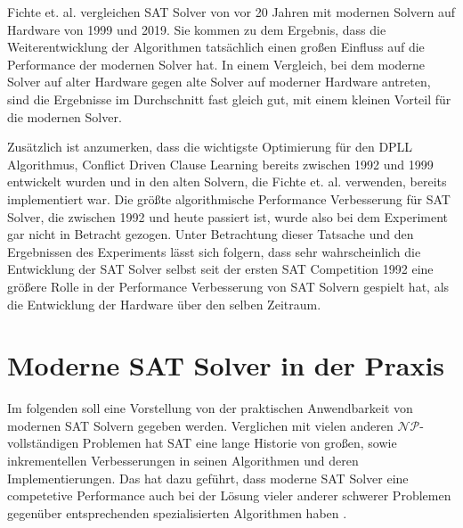 \documentclass[conference,compsoc,final,a4paper]{IEEEtran}
\begin{document}
Fichte et. al. \cite{time_leap_challenge} vergleichen SAT Solver von vor 20 Jahren mit modernen Solvern auf Hardware von 1999 und 2019. Sie kommen zu dem Ergebnis, dass die Weiterentwicklung der Algorithmen tatsächlich einen großen Einfluss auf die Performance der modernen Solver hat. In einem Vergleich, bei dem moderne Solver auf alter Hardware gegen alte Solver auf moderner Hardware antreten, sind die Ergebnisse im Durchschnitt fast gleich gut, mit einem kleinen Vorteil für die modernen Solver. \cite{time_leap_challenge}

Zusätzlich ist anzumerken, dass die wichtigste Optimierung für den DPLL Algorithmus, Conflict Driven Clause Learning bereits zwischen 1992 und 1999 entwickelt wurden und in den alten Solvern, die Fichte et. al. \cite{time_leap_challenge} verwenden, bereits implementiert war. Die größte algorithmische Performance Verbesserung für SAT Solver, die zwischen 1992 und heute passiert ist, wurde also bei dem Experiment gar nicht in Betracht gezogen.
Unter Betrachtung dieser Tatsache und den Ergebnissen des Experiments lässt sich folgern, dass sehr wahrscheinlich die Entwicklung der SAT Solver selbst seit der ersten SAT Competition 1992 eine größere Rolle in der Performance Verbesserung von SAT Solvern gespielt hat, als die Entwicklung der Hardware über den selben Zeitraum.



\section{Moderne SAT Solver in der Praxis}
Im folgenden soll eine Vorstellung von der praktischen Anwendbarkeit von modernen SAT Solvern gegeben werden. Verglichen mit vielen anderen $\mathcal{NP}$-vollständigen Problemen hat SAT eine lange Historie von großen, sowie inkrementellen Verbesserungen in seinen Algorithmen und deren Implementierungen. Das hat dazu geführt, dass moderne SAT Solver eine competetive Performance auch bei der Lösung vieler anderer schwerer Problemen gegenüber entsprechenden spezialisierten Algorithmen haben \cite{applying_sat_to_hard_problems}.
\end{document}
